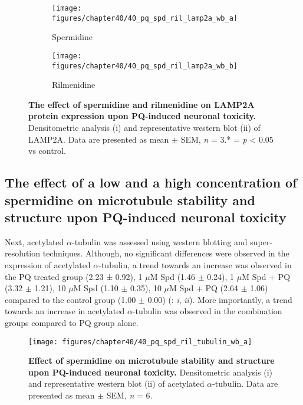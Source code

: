 \begin{figure}[!htbp]
  \center
  \begin{subfigure}[b]{0.495\linewidth}
    \texttt{[image: figures/chapter40/40\_pq\_spd\_ril\_lamp2a\_wb\_a]}
    \caption{Spermidine}
  \end{subfigure}
  \begin{subfigure}[b]{0.495\linewidth}
    \texttt{[image: figures/chapter40/40\_pq\_spd\_ril\_lamp2a\_wb\_b]}
    \caption{Rilmenidine}
  \end{subfigure}
  \caption[ The effect of spermidine and rilmenidine on LAMP2A protein expression upon PQ-induced neuronal toxicity]{\textbf{The effect of spermidine and rilmenidine on LAMP2A protein expression upon PQ-induced neuronal toxicity.} Densitometric analysis (i) and representative western blot  (ii) of LAMP2A. Data are presented as mean $\pm$ SEM, \textit{n} = 3.* = \textit{p} < 0.05 vs control.}
  \label{fig:40_pq_spd_ril_lamp2a_wb_a}
\end{figure}

\subsection{The effect of a low and a high concentration of spermidine on microtubule stability and structure upon PQ-induced neuronal toxicity}
Next, acetylated $\alpha$-tubulin was assessed using western blotting and super-resolution techniques. Although, no significant differences were observed in the expression of acetylated $\alpha$-tubulin, a trend towards an increase was observed in the PQ treated group (2.23 ± 0.92), 1 $\mu$M Spd (1.46 $\pm$ 0.24), 1 $\mu$M Spd + PQ (3.32 $\pm$ 1.21), 10 $\mu$M Spd (1.10 $\pm$ 0.35), 10 $\mu$M Spd + PQ (2.64 $\pm$ 1.06) compared to the control group (1.00 $\pm$ 0.00) (: \textit{i}, \textit{ii}). More importantly, a trend towards an increase in acetylated $\alpha$-tubulin was observed in the combination groups compared to PQ group alone. 

\begin{figure}[!htbp]
\center
  \texttt{[image: figures/chapter40/40\_pq\_spd\_ril\_tubulin\_wb\_a]}
  \caption[Effect of spermidine on microtubule stability and structure upon PQ-induced neuronal toxicity]{\textbf{Effect of spermidine on microtubule stability and structure upon PQ-induced neuronal toxicity.} Densitometric analysis (i) and representative western blot  (ii) of acetylated $\alpha$-tubulin. Data are presented as mean $\pm$ SEM, \textit{n} = 6.}
  \label{fig:40_pq_spd_ril_tubulin_wb_a}
\end{figure} 

